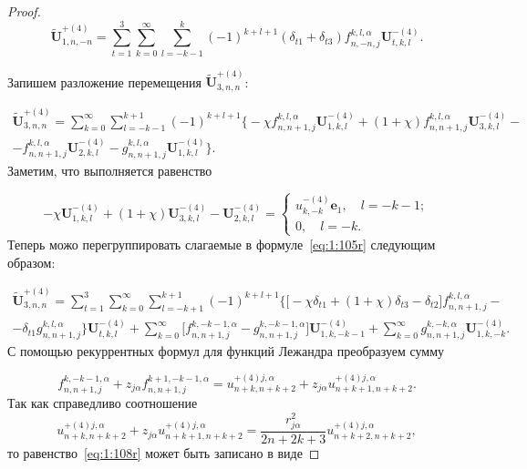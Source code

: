 \begin{proof}
\begin{equation}
\mathbf{\tilde U}_{1,n,-n}^{+(4)}=\sum\limits_{t=1}^3\sum\limits_{k=0}^\infty\sum\limits_{l=-k-1}^{k}(-1)^{k+l+1}(\delta_{t1}+\delta_{t3}){f}_{n,-n,j}^{k,l,\alpha}\mathbf{U}_{t,k,l}^{-(4)}.
\label{eq:1:104r}
\end{equation}

Запишем разложение перемещения $\mathbf{\tilde U}_{3,n,n}^{+(4)}$:

\begin{multline}\label{eq:1:105r}
\mathbf{\tilde U}_{3,n,n}^{+(4)}=\sum\limits_{k=0}^\infty\sum\limits_{l=-k-1}^{k+1}(-1)^{k+l+1}\bigg\{-\chi{f}_{n,n+1,j}^{k,l,\alpha}\mathbf{U}_{1,k,l}^{-(4)}+(1+\chi){f}_{n,n+1,j}^{k,l,\alpha}\mathbf{U}_{3,k,l}^{-(4)}- \\
-{f}_{n,n+1,j}^{k,l,\alpha}\mathbf{U}_{2,k,l}^{-(4)}-{g}_{n,n+1,j}^{k,l,\alpha}\mathbf{U}_{1,k,l}^{-(4)}\bigg\}.
\end{multline}
Заметим, что выполняется равенство

\begin{equation}
-\chi\mathbf{U}_{1,k,l}^{-(4)}+(1+\chi)\mathbf{U}_{3,k,l}^{-(4)}-
\mathbf{U}_{2,k,l}^{-(4)}=
\begin{cases}
u_{k,-k}^{-(4)}\mathbf{e}_1,\quad l=-k-1; \\
0,\quad l=-k.
\end{cases}
\label{eq:1:106r}
\end{equation}
Теперь можо перегруппировать слагаемые в формуле~\eqref{eq:1:105r} следующим образом:

\begin{multline}\label{eq:1:107r}
\mathbf{\tilde U}_{3,n,n}^{+(4)}=\sum\limits_{t=1}^3\sum\limits_{k=0}^\infty\sum\limits_{l=-k+1}^{k+1}(-1)^{k+l+1}\bigg\{\bigg\lbrack-\chi\delta_{t1}+(1+\chi)\delta_{t3}-
\delta_{t2}\bigg\rbrack{f}_{n,n+1,j}^{k,l,\alpha}- \\
-\delta_{t1}{g}_{n,n+1,j}^{k,l,\alpha}\bigg\}\mathbf{U}_{t,k,l}^{-(4)}+\sum\limits_{k=0}^\infty\bigg\lbrack
{f}_{n,n+1,j}^{k,-k-1,\alpha}-{g}_{n,n+1,j}^{k,-k-1,\alpha}\bigg\rbrack\mathbf{U}_{1,k,-k-1}^{-(4)}+\sum\limits_{k=0}^\infty{g}_{n,n+1,j}^{k,-k,\alpha}\mathbf{U}_{1,k,-k}^{-(4)}.
\end{multline}
С помощью рекуррентных формул для функций Лежандра преобразуем сумму

\begin{equation}
{f}_{n,n+1,j}^{k,-k-1,\alpha}+z_{j\alpha}{f}_{n,n+1,j}^{k+1,-k-1,\alpha}={u}_{n+k,n+k+2}^{+(4)j,\alpha}+z_{j\alpha}{u}_{n+k+1,n+k+2}^{+(4)j,\alpha}.
\label{eq:1:108r}
\end{equation}
Так как справедливо соотношение
$$
{u}_{n+k,n+k+2}^{ + (4)j,\alpha}+z_{j\alpha}{u}_{n+k+1,n+k+2}^{+(4)j,\alpha}=\frac{r_{j\alpha}^2}{2n+2k+3}u_{n+k+2,n+k+2}^{+(4)j,\alpha},
$$
то равенство~\eqref{eq:1:108r} может быть записано в виде


\end{proof}
